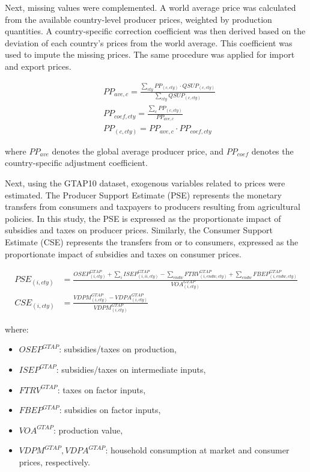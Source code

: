 Next, missing values were complemented.  
A world average price was calculated from the available country-level producer prices, 
weighted by production quantities.  
A country-specific correction coefficient was then derived 
based on the deviation of each country's prices from the world average.  
This coefficient was used to impute the missing prices.  
The same procedure was applied for import and export prices.

\begin{align}
&PP_{ave,c} = 
\frac{\sum_{cty} PP_{(c,cty)} \cdot QSUP_{(c,cty)}}{\sum_{cty} QSUP_{(c,cty)}} \\
&PP_{coef,cty} = 
\frac{\sum_{c} PP_{(c,cty)}}{PP_{ave,c}} \\
&PP_{(c,cty)} = 
PP_{ave,c} \cdot PP_{coef,cty}
\end{align}

where \( PP_{ave} \) denotes the global average producer price,  
and \( PP_{coef} \) denotes the country-specific adjustment coefficient.

\bigskip

Next, using the GTAP10 dataset, exogenous variables related to prices were estimated.  
The Producer Support Estimate (PSE) represents the monetary transfers 
from consumers and taxpayers to producers resulting from agricultural policies.  
In this study, the PSE is expressed as the proportionate impact of 
subsidies and taxes on producer prices.  
Similarly, the Consumer Support Estimate (CSE) represents 
the transfers from or to consumers, 
expressed as the proportionate impact of subsidies and taxes on consumer prices.

\begin{align}
PSE_{(i,cty)} &= 
\frac{
OSEP^{GTAP}_{(i,cty)} 
+ \sum_i ISEP^{GTAP}_{(i,ii,cty)} 
- \sum_{endw} FTRV^{GTAP}_{(i,endw,cty)} 
+ \sum_{endw} FBEP^{GTAP}_{(i,endw,cty)}
}{
VOA^{GTAP}_{(i,cty)}
} \\
CSE_{(i,cty)} &= 
\frac{VDPM^{GTAP}_{(i,cty)} - VDPA^{GTAP}_{(i,cty)}}{VDPM^{GTAP}_{(i,cty)}}
\end{align}

where:
\begin{itemize}
\item \( OSEP^{GTAP} \): subsidies/taxes on production,  
\item \( ISEP^{GTAP} \): subsidies/taxes on intermediate inputs,  
\item \( FTRV^{GTAP} \): taxes on factor inputs,  
\item \( FBEP^{GTAP} \): subsidies on factor inputs,  
\item \( VOA^{GTAP} \): production value,  
\item \( VDPM^{GTAP}, VDPA^{GTAP} \): household consumption at market and consumer prices, respectively.
\end{itemize}

